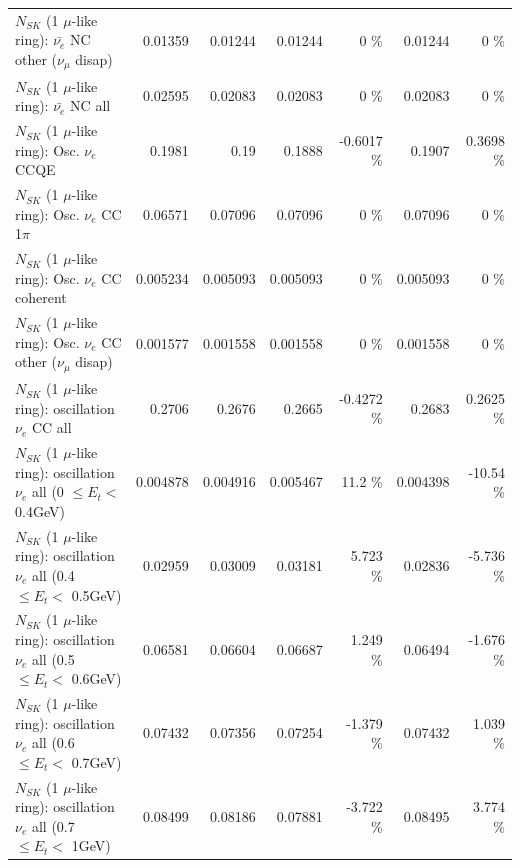 \begin{table}
\begin{tabular}{| l | r | r | r  r | r  r |}
          $N_{SK}$ (1 $\mu$-like ring): $\bar{\nu_e}$ NC other ($\nu_\mu$ disap) &         0.01359 &         0.01244 &         0.01244 &        0 \%  &         0.01244 &        0 \%  \\ 
                            $N_{SK}$ (1 $\mu$-like ring): $\bar{\nu_{e}}$ NC all &         0.02595 &         0.02083 &         0.02083 &        0 \%  &         0.02083 &        0 \%  \\ 
\hline
\hline
\hline
                                 $N_{SK}$ (1 $\mu$-like ring): Osc. $\nu_e$ CCQE &          0.1981 &            0.19 &          0.1888 &  -0.6017 \%  &          0.1907 &   0.3698 \%  \\ 
                            $N_{SK}$ (1 $\mu$-like ring): Osc. $\nu_e$ CC 1$\pi$ &         0.06571 &         0.07096 &         0.07096 &        0 \%  &         0.07096 &        0 \%  \\ 
                          $N_{SK}$ (1 $\mu$-like ring): Osc. $\nu_e$ CC coherent &        0.005234 &        0.005093 &        0.005093 &        0 \%  &        0.005093 &        0 \%  \\ 
           $N_{SK}$ (1 $\mu$-like ring): Osc. $\nu_e$ CC other ($\nu_\mu$ disap) &        0.001577 &        0.001558 &        0.001558 &        0 \%  &        0.001558 &        0 \%  \\ 
                        $N_{SK}$ (1 $\mu$-like ring): oscillation $\nu_e$ CC all &          0.2706 &          0.2676 &          0.2665 &  -0.4272 \%  &          0.2683 &   0.2625 \%  \\ 
\hline
$N_{SK}$ (1 $\mu$-like ring): oscillation $\nu_{e}$ all (0 $\leq E_{t} <$ 0.4GeV) &        0.004878 &        0.004916 &        0.005467 &     11.2 \%  &        0.004398 &   -10.54 \%  \\ 
$N_{SK}$ (1 $\mu$-like ring): oscillation $\nu_{e}$ all (0.4 $\leq E_{t} <$ 0.5GeV) &         0.02959 &         0.03009 &         0.03181 &    5.723 \%  &         0.02836 &   -5.736 \%  \\ 
$N_{SK}$ (1 $\mu$-like ring): oscillation $\nu_{e}$ all (0.5 $\leq E_{t} <$ 0.6GeV) &         0.06581 &         0.06604 &         0.06687 &    1.249 \%  &         0.06494 &   -1.676 \%  \\ 
$N_{SK}$ (1 $\mu$-like ring): oscillation $\nu_{e}$ all (0.6 $\leq E_{t} <$ 0.7GeV) &         0.07432 &         0.07356 &         0.07254 &   -1.379 \%  &         0.07432 &    1.039 \%  \\ 
$N_{SK}$ (1 $\mu$-like ring): oscillation $\nu_{e}$ all (0.7 $\leq E_{t} <$ 1GeV) &         0.08499 &         0.08186 &         0.07881 &   -3.722 \%  &         0.08495 &    3.774 \%  \\ 

\end{tabular}
\end{table}
